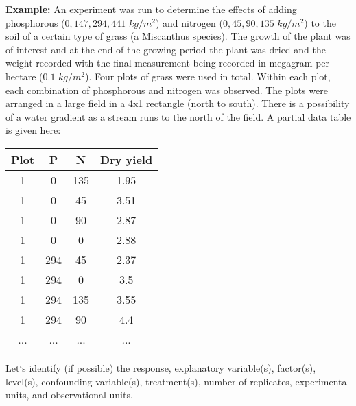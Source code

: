 \textbf{Example: } An experiment was run to determine the effects of adding phosphorous ($0, 147, 294, 441$ $kg/m^2$) and nitrogen ($0, 45, 90, 135$ $kg/m^2$) to the soil of a certain type of grass (a Miscanthus species).  The growth of the plant was of interest and at the end of the growing period the plant was dried and the weight recorded with the final measurement being recorded in megagram per hectare ($0.1$ $kg/m^2$).  Four plots of grass were used in total.  Within each plot, each combination of phosphorous and nitrogen was observed.  The plots were arranged in a large field in a 4x1 rectangle (north to south).  There is a possibility of a water gradient as a stream runs to the north of the field.   A partial data table is given here: 
\begin{center}
\begin{tabular}{c|c|c|c}
\hline
Plot	&P	&N&	Dry yield\\
\hline
1&	0&	135&	1.95\\
1&	0&	45&	3.51\\
1&	0&	90&	2.87\\
1&	0&	0&	2.88\\
1&	294	&45&	2.37\\
1&	294	&0&	3.5\\
1&	294	&135&	3.55\\
1&	294&	90&	4.4\\
...&...&...&...\\
\end{tabular}
\end{center}
Let`s identify (if possible) the response, explanatory variable(s), factor(s), level(s), confounding variable(s), treatment(s), number of replicates, experimental units, and observational units.  \\

\newpage

